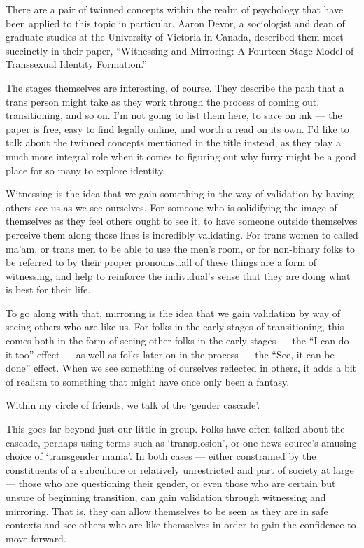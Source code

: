 There are a pair of twinned concepts within the realm of psychology that have been applied to this topic in particular.  Aaron Devor, a sociologist and dean of graduate studies at the University of Victoria in Canada, described them most succinctly in their paper, ``Witnessing and Mirroring: A Fourteen Stage Model of Transsexual Identity Formation.''

The stages themselves are interesting, of course.  They describe the path that a trans person might take as they work through the process of coming out, transitioning, and so on.  I'm not going to list them here, to save on ink --- the paper is free, easy to find legally online, and worth a read on its own.  I'd like to talk about the twinned concepts mentioned in the title instead, as they play a much more integral role when it comes to figuring out why furry might be a good place for so many to explore identity.

Witnessing is the idea that we gain something in the way of validation by having others see us as we see ourselves.  For someone who is solidifying the image of themselves as they feel others ought to see it, to have someone outside themselves perceive them along those lines is incredibly validating.  For trans women to called ma'am, or trans men to be able to use the men's room, or for non-binary folks to be referred to by their proper pronouns\ldots{}all of these things are a form of witnessing, and help to reinforce the individual's sense that they are doing what is best for their life.

To go along with that, mirroring is the idea that we gain validation by way of seeing others who are like us.  For folks in the early stages of transitioning, this comes both in the form of seeing other folks in the early stages --- the ``I can do it too'' effect --- as well as folks later on in the process --- the ``See, it can be done'' effect.  When we see something of ourselves reflected in others, it adds a bit of realism to something that might have once only been a fantasy.

Within my circle of friends, we talk of the `gender cascade'.

This goes far beyond just our little in-group.  Folks have often talked about the cascade, perhaps using terms such as `transplosion', or one news source's amusing choice of `transgender mania'.  In both cases --- either constrained by the constituents of a subculture or relatively unrestricted and part of society at large --- those who are questioning their gender, or even those who are certain but unsure of beginning transition, can gain validation through witnessing and mirroring.  That is, they can allow themselves to be seen as they are in safe contexts and see others who are like themselves in order to gain the confidence to move forward.

